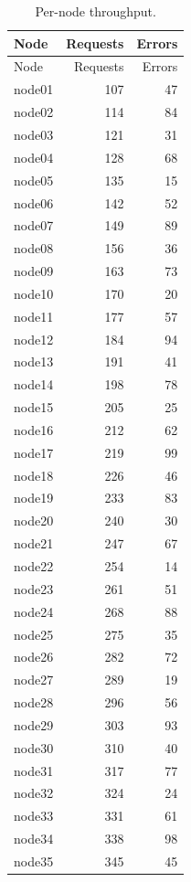 \documentclass[11pt,letterpaper]{article}
\begin{document}
\newpage
\begin{longtable}{l r r}
\caption{Per-node throughput.}\\
\toprule
Node & Requests & Errors \\
\midrule
\endfirsthead
\toprule
Node & Requests & Errors \\
\midrule
\endhead
\bottomrule
\endfoot
node01 & 107 & 47 \\
node02 & 114 & 84 \\
node03 & 121 & 31 \\
node04 & 128 & 68 \\
node05 & 135 & 15 \\
node06 & 142 & 52 \\
node07 & 149 & 89 \\
node08 & 156 & 36 \\
node09 & 163 & 73 \\
node10 & 170 & 20 \\
node11 & 177 & 57 \\
node12 & 184 & 94 \\
node13 & 191 & 41 \\
node14 & 198 & 78 \\
node15 & 205 & 25 \\
node16 & 212 & 62 \\
node17 & 219 & 99 \\
node18 & 226 & 46 \\
node19 & 233 & 83 \\
node20 & 240 & 30 \\
node21 & 247 & 67 \\
node22 & 254 & 14 \\
node23 & 261 & 51 \\
node24 & 268 & 88 \\
node25 & 275 & 35 \\
node26 & 282 & 72 \\
node27 & 289 & 19 \\
node28 & 296 & 56 \\
node29 & 303 & 93 \\
node30 & 310 & 40 \\
node31 & 317 & 77 \\
node32 & 324 & 24 \\
node33 & 331 & 61 \\
node34 & 338 & 98 \\
node35 & 345 & 45 \\

\end{longtable}
\end{document}
